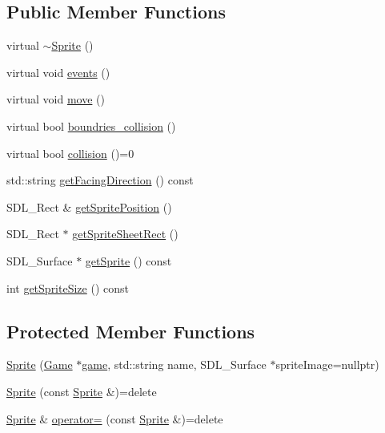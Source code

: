 \subsection*{Public Member Functions}
\begin{DoxyCompactItemize}
\item 
virtual \hyperlink{classSprite_a8accab430f9d90ae5117b57d67e32b84}{$\sim$\-Sprite} ()
\item 
virtual void \hyperlink{classSprite_a82cd02f494fe948457a8feb5ecd93212}{events} ()
\item 
virtual void \hyperlink{classSprite_afcf196c3d93fd743fdcc6f84d128ece6}{move} ()
\item 
virtual bool \hyperlink{classSprite_a82752d76482fb36ac5d3a22d86a50251}{boundries\-\_\-collision} ()
\item 
virtual bool \hyperlink{classSprite_ae0c21af6a4fc7fb8e9daf72675a1ec50}{collision} ()=0
\item 
std\-::string \hyperlink{classSprite_a5c3b19e7e0c8d831082c72a0b1aecd05}{get\-Facing\-Direction} () const 
\item 
S\-D\-L\-\_\-\-Rect \& \hyperlink{classSprite_a9009a87de777c6b9e0878b42716f159e}{get\-Sprite\-Position} ()
\item 
S\-D\-L\-\_\-\-Rect $\ast$ \hyperlink{classSprite_aa000074f1bd6ee67be85397d9b58e24d}{get\-Sprite\-Sheet\-Rect} ()
\item 
S\-D\-L\-\_\-\-Surface $\ast$ \hyperlink{classSprite_a8f1f384e8564dbd0ad18c75e782abb0f}{get\-Sprite} () const 
\item 
int \hyperlink{classSprite_abd54a55219e28b8865ee2ee177bc2811}{get\-Sprite\-Size} () const 
\end{DoxyCompactItemize}
\subsection*{Protected Member Functions}
\begin{DoxyCompactItemize}
\item 
\hyperlink{classSprite_a569ab75b5c75faa42c6ec2cfc14886ab}{Sprite} (\hyperlink{classGame}{Game} $\ast$\hyperlink{classSprite_a72c2faa2522184ea3cd81a1d50168a34}{game}, std\-::string name, S\-D\-L\-\_\-\-Surface $\ast$sprite\-Image=nullptr)
\item 
\hyperlink{classSprite_ab216809ce70a929c1e4407ce39b57547}{Sprite} (const \hyperlink{classSprite}{Sprite} \&)=delete
\item 
\hyperlink{classSprite}{Sprite} \& \hyperlink{classSprite_ab608eb8af8a6d50d3fd784170102cbc6}{operator=} (const \hyperlink{classSprite}{Sprite} \&)=delete
\end{DoxyCompactItemize}
